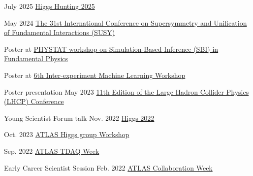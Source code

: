 

\begin{cventries}
    
    {}
    {July 2025}
    {\href{https://indico.ijclab.in2p3.fr/event/11484/contributions/37820/}{Higgs Hunting 2025}}
    {}

    {}
    {May 2024}
    {\href{https://indico.cern.ch/event/1354279/contributions/5942297/}{The 31st International Conference on Supersymmetry and Unification of Fundamental Interactions (SUSY)}}
    {}

    {}
    {}
    {}
    {
        \begin{cvitems}
        \item Poster at \href{https://indico.cern.ch/event/1355601/contributions/5910202/}{PHYSTAT workshop on Simulation-Based Inference (SBI) in Fundamental Physics}
        \item Poster at \href{https://indico.cern.ch/event/1297159/contributions/5729232/}{6th Inter-experiment Machine Learning Workshop}
        \end{cvitems}
    }
   
    {Poster presentation}
    {May 2023}
    {\href{https://indico.cern.ch/event/1198609/contributions/5340462/}{11th Edition of the Large Hadron Collider Physics (LHCP) Conference}}
    {}
    
    {Young Scientist Forum talk}
    {Nov. 2022}
    {\href{https://indico.cern.ch/event/1086716/contributions/5049260/}{Higgs 2022}}
    {}

\end{cventries}



\begin{cventries}
    
    {}
    {Oct. 2023}
    {\href{https://indico.cern.ch/event/1280531/contributions/5556190/}{ATLAS Higgs group Workshop}}{}

    {}
    {Sep. 2022}
    {\href{https://indico.cern.ch/event/1172448/contributions/4924082/}{ATLAS TDAQ Week}}
    {}

    {Early Career Scientist Session}
    {Feb. 2022}
    {\href{https://indico.cern.ch/event/1108354/\#167-readiness-of-the-jet-trigg}{ATLAS Collaboration Week}}{}

\end{cventries}